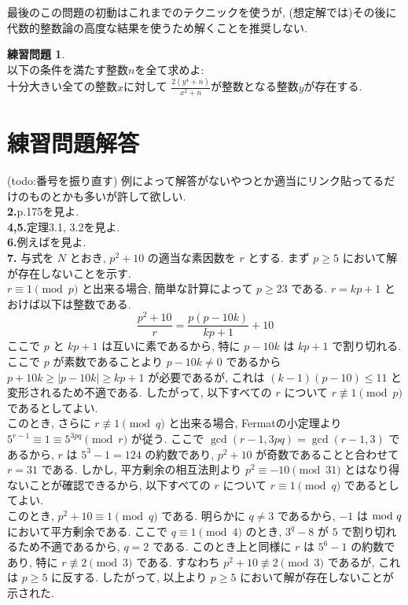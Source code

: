 \documentclass{ltjsarticle}
\theoremstyle{definition}
\newtheorem{prob}{練習問題}
\begin{document}
最後のこの問題の初動はこれまでのテクニックを使うが, (想定解では)その後に代数的整数論の高度な結果を使うため解くことを推奨しない. 
\begin{prob}\ \\
以下の条件を満たす整数$n$を全て求めよ:\\
十分大きい全ての整数$x$に対して
$\displaystyle\frac{2(y^4+n)}{x^2+n}$が整数となる整数$y$が存在する.
\end{prob}
\newpage
\section{練習問題解答}(todo:番号を振り直す)
例によって解答がないやつとか適当にリンク貼ってるだけのものとかも多いが許して欲しい.\\
\textbf{2.}\cite{獲得}p.175を見よ.\\
\textbf{4,5.}\cite{合同式に基づく古典的な素数判定法}定理3.1, 3.2を見よ.\\
\textbf{6.}例えば\cite{冪乗}を見よ.\\
\textbf{7.}
\indent 与式を $N$ とおき, $p^2+10$ の適当な素因数を $r$ とする. まず $p\geq 5$ において解が存在しないことを示す.\\
\indent $r\equiv 1\pmod p$ と出来る場合, 簡単な計算によって $p\geq 23$ である. $r=kp+1$ とおけば以下は整数である.
$$\frac{p^2+10}{r}=\frac{p(p-10k)}{kp+1}+10$$
ここで $p$ と $kp+1$ は互いに素であるから, 特に $p-10k$ は $kp+1$ で割り切れる. ここで $p$ が素数であることより $p-10k\neq 0$ であるから $p+10k\geq |p-10k|\geq kp+1$ が必要であるが, これは $(k-1)(p-10)\leq 11$ と変形されるため不適である. したがって, 以下すべての $r$ について $r\not\equiv1\pmod p$ であるとしてよい.\\
\indent このとき, さらに $r\not\equiv 1\pmod q$ と出来る場合, Fermatの小定理より $5^{r-1}\equiv 1\equiv 5^{3pq} \pmod r$ が従う.
ここで $\gcd(r-1,3pq)=\gcd(r-1,3)$ であるから, $r$ は $5^3-1=124$ の約数であり, $p^2+10$ が奇数であることと合わせて $r=31$ である. しかし, 平方剰余の相互法則より $p^2\equiv -10\pmod{31}$ とはなり得ないことが確認できるから, 以下すべての $r$ について $r\equiv 1 \pmod q$ であるとしてよい.\\
\indent このとき, $p^2+10\equiv 1\pmod q$ である. 明らかに $q\neq 3$ であるから, $-1$ は ${\rm mod}\ q$ において平方剰余である. ここで $q\equiv 1\pmod 4$ のとき, $3^q-8$ が $5$ で割り切れるため不適であるから, $q=2$ である. このとき上と同様に $r$
は $5^6-1$ の約数であり, 特に $r\not\equiv 2\pmod 3$ である. すなわち $p^2+10\not\equiv 2\pmod 3$ であるが, これは $p\geq 5$ に反する. したがって, 以上より $p\geq 5$ において解が存在しないことが示された.\\
\end{document}
